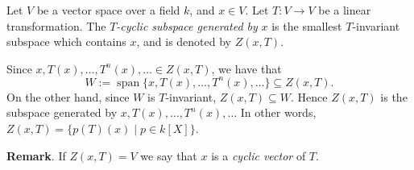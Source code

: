 \documentclass[12pt]{article}
\begin{document}
Let $V$ be a vector space over a field $k$, and $x \in V$. Let $T:V\to V$ be a linear transformation. The \emph{$T$-cyclic subspace generated by} $x$ is the smallest $T$-invariant subspace which contains $x$, and is denoted by $Z(x, T)$. 

Since $x,T(x),\ldots, T^n(x),\ldots \in Z(x,T)$, we have that $$W:=\operatorname{span}\lbrace x,T(x),\ldots,T^n(x),\ldots\rbrace \subseteq Z(x,T).$$  On the other hand, since $W$ is $T$-invariant, $Z(x,T)\subseteq W$.  Hence $Z(x,T)$ is the subspace generated by $x,T(x),\ldots, T^n(x),\ldots$  In other words, $Z(x,T)=\{p(T)(x) \mid p \in k[X]\}$.

\textbf{Remark}.  If $Z(x,T)=V$ we say that $x$ is a \emph{cyclic vector} of $T$.  
\end{document}
